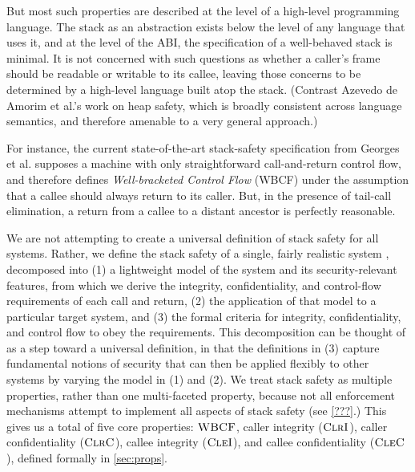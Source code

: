 But most such properties are described at the level of a high-level programming language.
The stack as an abstraction exists below the level of
any language that uses it, and at the level of the ABI, the specification of a well-behaved
stack is minimal. It is not concerned with such questions as whether a caller's
frame should be readable or writable to its callee, leaving those concerns
to be determined by a high-level language built atop the stack.
(Contrast Azevedo de Amorim et al.'s \cite{DBLP:conf/post/AmorimHP18} work on heap safety,
which is broadly consistent across language semantics, and therefore
amenable to a very general approach.)

For instance, the current state-of-the-art stack-safety specification from Georges et al.
\cite{Georges22:TempsDesCerises} supposes a machine with only straightforward call-and-return
control flow, and therefore defines {\em Well-bracketed Control Flow} (WBCF) under the assumption that
a callee should always return to its caller. But, in the presence of tail-call elimination, a
return from a callee to a distant ancestor is perfectly reasonable.

We are not attempting to create  a universal definition of stack safety for all systems.
Rather, we define the stack safety of a single, fairly realistic system , decomposed into
(1) a lightweight model of the system and its security-relevant features, from which we
derive the integrity, confidentiality, and control-flow requirements of each call and
return, (2) the application of that model to a particular target system, and (3)
the formal criteria for integrity, confidentiality, and control flow
to obey the requirements. This decomposition can be thought of as a step toward
a universal definition, in that the definitions in (3) capture fundamental
notions of security that can then be applied flexibly to other systems by varying
the model in (1) and (2).
%
We treat stack safety as multiple properties, rather than one multi-faceted property, because
not all enforcement mechanisms attempt to implement all aspects of stack safety (see \cref{???}.)
%
This gives us a total of five core properties: \(\textnormal{\sc WBCF}\),
caller integrity (\(\textnormal{\sc ClrI}\)), caller confidentiality (\(\textnormal{\sc ClrC}\)),
callee integrity (\(\textnormal{\sc CleI}\)), and callee confidentiality (\(\textnormal{\sc CleC}\)), defined formally
in \cref{sec:props}.

